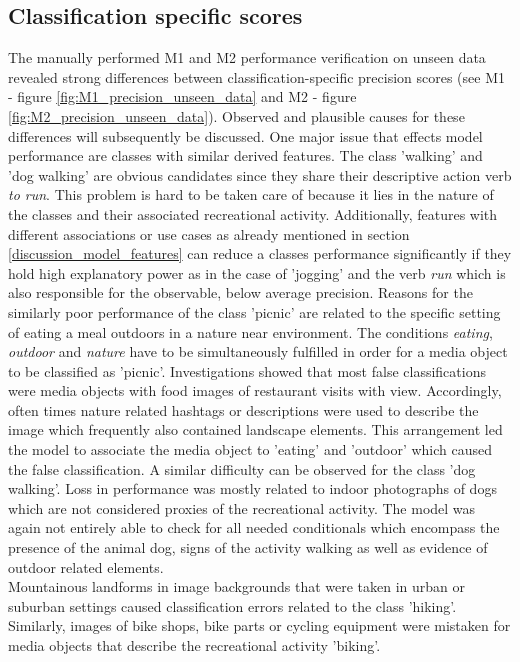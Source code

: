 \subsection{Classification specific scores}\label{discussion_class_specific_perform}
The manually performed M1 and M2 performance verification on unseen data revealed strong differences between classification-specific precision scores (see M1 - figure \ref{fig:M1_precision_unseen_data} and M2 - figure \ref{fig:M2_precision_unseen_data}). Observed and plausible causes for these differences will subsequently be discussed.
One major issue that effects model performance are classes with similar derived features. The class 'walking' and 'dog walking' are obvious candidates since they share their descriptive action verb \textit{to run}. This problem is hard to be taken care of because it lies in the nature of the classes and their associated recreational activity.
Additionally, features with different associations or use cases as already mentioned in section \ref{discussion_model_features} can reduce a classes performance significantly if they hold high explanatory power as in the case of 'jogging' and the verb \textit{run} which is also responsible for the observable, below average precision. Reasons for the similarly poor performance of the class 'picnic' are related to the specific setting of eating a meal outdoors in a nature near environment. The conditions \textit{eating}, \textit{outdoor} and \textit{nature} have to be simultaneously fulfilled in order for a media object to be classified as 'picnic'. Investigations showed that most false classifications were media objects with food images of restaurant visits with view. Accordingly, often times nature related hashtags or descriptions were used to describe the image which frequently also contained landscape elements. This arrangement led the model to associate the media object to 'eating' and 'outdoor' which caused the false classification. A similar difficulty can be observed for the class 'dog walking'. Loss in performance was mostly related to indoor photographs of dogs which are not considered proxies of the recreational activity. The model was again not entirely able to check for all needed conditionals which encompass the presence of the animal dog, signs of the activity walking as well as evidence of outdoor related elements. \\
Mountainous landforms in image backgrounds that were taken in urban or suburban settings caused classification errors related to the class 'hiking'. Similarly, images of bike shops, bike parts or cycling equipment were mistaken for media objects that describe the recreational activity 'biking'. \\

